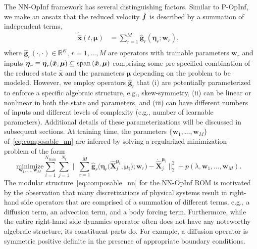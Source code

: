 \documentclass[3p,computermodern,11pt]{elsarticle}
\numberwithin{equation}{section}
\newcommand{\reducedLhs}{\dot{\hat{\state}}}
\newcommand{\reducedState}{\hat{\state}}
\newcommand{\reducedStateCoDomain}{\RR{\romDim}}
\newcommand{\reducedSnapshotsLhs}{\dot{\hat{\snapshotsState}}}
\newcommand{\penaltyFunction}{p}
\newcommand{\penaltyParameter}{\lambda}
\newcommand{\nOperators}{M}
\newcommand{\reducedVelocityNN}{\hat{\boldsymbol g}}
\newcommand{\networkInputs}{\boldsymbol \eta}
\newcommand{\weights}{\mathbf{w}}
\newcommand{\nt}{N_t}
\newcommand{\snapshotsState}{\mathbf{X}}
\newcommand{\reducedSnapshotsState}{\hat{\mathbf{X}}}
\newcommand{\reducedVelocity}{\skew{4}\hat{\velocity}}
\newcommand{\state}{\boldsymbol x}
\newcommand{\velocity}{\boldsymbol f}
\newcommand{\params}{\boldsymbol \mu}
\newcommand{\RR}[1]{\mathbb{R}^{#1}}
\newcommand{\romDim}{K}
\newcommand{\nTrain}{N_{\text{train}}}
\begin{document}
The NN-OpInf framework has several distinguishing factors. Similar to P-OpInf, we make an ansatz that the reduced velocity $\reducedVelocity$ is described by a summation of independent terms, 
\begin{equation}\label{eq:composable_nn}
\begin{split}
\reducedLhs(t,\params) &= \sum_{r=1}^{\nOperators} \reducedVelocityNN_r (\networkInputs_r ; \weights_r )  , \\
\end{split}
\end{equation}
where $\reducedVelocityNN_r (\cdot,\cdot) \in \reducedStateCoDomain$, $r=1,\ldots,\nOperators$ are operators with trainable parameters $\weights_r$ and inputs $\networkInputs_r \equiv \networkInputs_r(\reducedState,\params) \subseteq {\rm span}\left(\reducedState, \params \right)$ comprising some pre-specified combination of the reduced state $\reducedState$ and the parameters $\params$ depending on the problem to be modeled. However, we employ operators $\reducedVelocityNN_r$ that (i) are potentially parameterized to enforce a specific algebraic structure, e.g., skew-symmetry, (ii) can be linear or nonlinear in both the state and parameters, and (iii) can have different numbers of inputs and different levels of complexity (e.g., number of learnable parameters).  
Additional details of these parameterizations will be discussed in subsequent sections. At training time, the parameters $\{\weights_1,\ldots,\weights_M\}$ of~\eqref{eq:composable_nn} are inferred by solving a regularized minimization problem of the form
\begin{equation}\label{eq:nn_opinf_optimization}
\underset{ \weights_1, \ldots, \weights_\nOperators}{\mathrm{minimize}} \sum_{i=1}^{\nTrain} \sum_{j=1}^{\nt} \bigg\|  \sum_{r=1}^{\nOperators} \reducedVelocityNN_r \Big(\networkInputs_r\big( \reducedSnapshotsState^{\params_i}_j , \params_i \big); \weights_r \Big)  - \reducedSnapshotsLhs^{\params_i}_j \bigg\|_2^2 + \penaltyFunction \left(\penaltyParameter,\weights_1,\ldots,\weights_M \right).
\end{equation}
The modular structure~\eqref{eq:composable_nn} for the NN-OpInf ROM is motivated by the observation that many discretizations of physical systems result in right-hand side operators that are comprised of a summation of different terms, e.g., a diffusion term, an advection term, and a body forcing term. Furthermore, while the entire right-hand side dynamics operator often does not have any noteworthy algebraic structure, its constituent parts do.  For example, a diffusion operator is symmetric positive definite in the presence of appropriate boundary conditions. 
\end{document}
